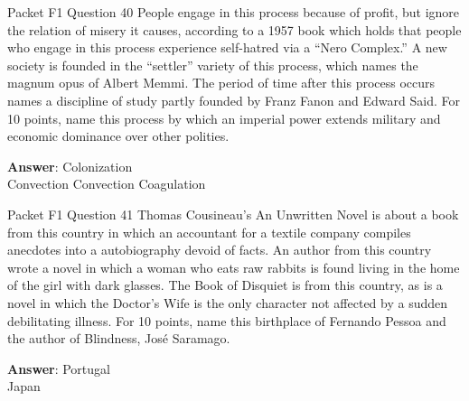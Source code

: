 \begin{frame}{Packet F1 Question 40}
People engage in this process because of profit, but ignore the relation of misery it causes, according to a 1957 book which holds that people who engage in this process experience self-hatred via a “Nero Complex.” A new society is founded in the “settler” variety of this process, which names the magnum opus of Albert Memmi. The period of time after this process occurs names a discipline   of study partly founded by Franz Fanon and Edward Said. For 10 points, name this process by which an imperial power   extends military   and economic dominance over other polities.    

\textbf{Answer}: Colonization\\
 Convection
 Convection
 Coagulation
\end{frame}

\begin{frame}{Packet F1 Question 41}
Thomas Cousineau’s An Unwritten Novel is about a book from this country in which an accountant for a textile company compiles anecdotes into a autobiography devoid of facts. An author from this country wrote a novel in which a woman who eats raw rabbits is found living in the home of the girl with dark glasses. The Book of Disquiet is from   this country, as is a novel in which the Doctor’s Wife is the only character not affected by a sudden debilitating illness. For 10 points, name this birthplace of Fernando Pessoa and     the author of Blindness, José Saramago.  

\textbf{Answer}: Portugal\\
 Japan
\end{frame}

